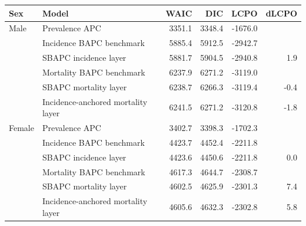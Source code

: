 \begingroup
\renewcommand{\arraystretch}{1.08}
\setlength{\tabcolsep}{4pt}
\begin{tabular}{llrrrr}
\toprule
Sex & Model & WAIC & DIC & LCPO & dLCPO \\
\midrule
Male & Prevalence APC & 3351.1 & 3348.4 & -1676.0 &  \\
 & Incidence BAPC benchmark & 5885.4 & 5912.5 & -2942.7 &  \\
 & SBAPC incidence layer & 5881.7 & 5904.5 & -2940.8 & 1.9 \\
 & Mortality BAPC benchmark & 6237.9 & 6271.2 & -3119.0 &  \\
 & SBAPC mortality layer & 6238.7 & 6266.3 & -3119.4 & -0.4 \\
 & Incidence-anchored mortality layer & 6241.5 & 6271.2 & -3120.8 & -1.8 \\
\midrule
Female & Prevalence APC & 3402.7 & 3398.3 & -1702.3 &  \\
 & Incidence BAPC benchmark & 4423.7 & 4452.4 & -2211.8 &  \\
 & SBAPC incidence layer & 4423.6 & 4450.6 & -2211.8 & 0.0 \\
 & Mortality BAPC benchmark & 4617.3 & 4644.7 & -2308.7 &  \\
 & SBAPC mortality layer & 4602.5 & 4625.9 & -2301.3 & 7.4 \\
 & Incidence-anchored mortality layer & 4605.6 & 4632.3 & -2302.8 & 5.8 \\
\bottomrule
\end{tabular}
\endgroup
